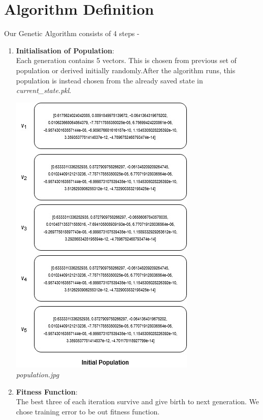 \documentclass[11pt]{article}
\begin{document}
	\section{Algorithm Definition}
	Our Genetic Algorithm consists of 4 steps - 
	\begin{enumerate}
		\item \textbf{Initialisation of Population}:\\
		Each generation contains 5 vectors. This is chosen from previous set of population or derived initially randomly.After the algorithm runs, this population is instead chosen from the already saved state in \textit{current\_state.pkl}.
		\begin{center}
			\includegraphics[width=0.6\linewidth]{population.jpg}
			\\
			\textit{population.jpg}
		  \end{center}
		\item \textbf{Fitness Function}:\\
		The best three of each iteration survive
and give birth to next generation. We chose training error to be out fitness function.
\begin{center}

\end{center}
\end{enumerate}
\end{document}
